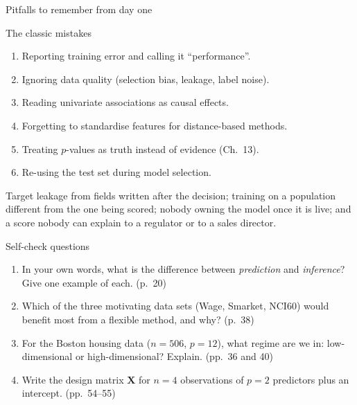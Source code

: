 \documentclass[aspectratio=169,11pt]{beamer}
\begin{document}
\begin{frame}{Pitfalls to remember from day one}
  \begin{alertblock}{The classic mistakes}
    \begin{enumerate}
      \item Reporting training error and calling it ``performance''.
      \item Ignoring data quality (selection bias, leakage, label
            noise).
      \item Reading univariate associations as causal effects.
      \item Forgetting to standardise features for distance-based
            methods.
      \item Treating $p$-values as truth instead of evidence (Ch.~13).
      \item Re-using the test set during model selection.
    \end{enumerate}
  \end{alertblock}
  \begin{industry}
    Target leakage from fields written after the decision; training on a population different
    from the one being scored; nobody owning the model once it is live; and a score nobody can
    explain to a regulator or to a sales director.
  \end{industry}
\end{frame}

\begin{frame}{Self-check questions}
  \begin{enumerate}
    \item In your own words, what is the difference between
          \emph{prediction} and \emph{inference}? Give one example of
          each. (p.~20)
    \item Which of the three motivating data sets (Wage, Smarket,
          NCI60) would benefit most from a flexible method, and why?
          (p.~38)
    \item For the Boston housing data ($n = 506$, $p = 12$), what
          regime are we in: low-dimensional or high-dimensional?
          Explain. (pp.~36 and 40)
    \item Write the design matrix $\mathbf{X}$ for $n = 4$
          observations of $p = 2$ predictors plus an intercept. (pp.~54--55)
  \end{enumerate}
\end{frame}
\end{document}
